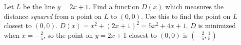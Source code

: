 {Let $L$ be the line $y = 2x+1$.  Find a function $D(x)$ which measures the distance \textit{squared} from a point on $L$ to $(0,0)$.  Use this to find the point on $L$ closest to $(0,0)$.}
{$D(x) = x^2 + (2x+1)^2 = 5x^2+4x+1$,  $D$ is minimized when $x=-\frac{2}{5}$, so the point on $y=2x+1$ closest to $(0,0)$ is $\left(-\frac{2}{5}, \frac{1}{5}\right)$}